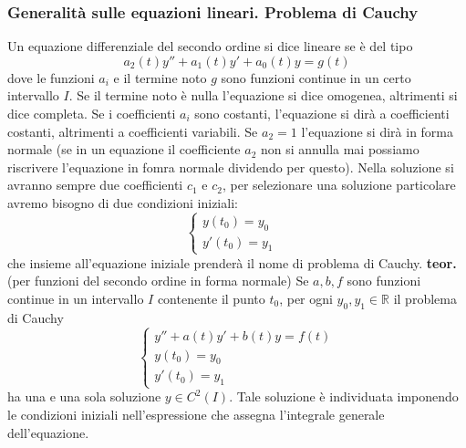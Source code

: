 \subsubsection{Generalità sulle equazioni lineari. Problema di Cauchy}
Un equazione differenziale del secondo ordine si dice lineare se è del tipo
\[
    a_2(t) y'' + a_1(t) y' +a_0(t) y = g(t)
\]
dove le funzioni $a_i$ e il termine noto $g$ sono funzioni continue in un certo intervallo $I$.\newline
Se il termine noto è nulla l'equazione si dice omogenea, altrimenti si dice completa.\newline
Se i coefficienti $a_i$ sono costanti, l'equazione si dirà a coefficienti costanti, altrimenti a coefficienti variabili.\newline
Se $a_2 = 1$ l'equazione si dirà in forma normale (se in un equazione il coefficiente $a_2$ non si annulla mai possiamo riscrivere l'equazione in fomra normale dividendo per questo).\newline
\newline
Nella soluzione si avranno sempre due coefficienti $c_1$ e $c_2$, per selezionare una soluzione particolare avremo bisogno di due condizioni iniziali:
\[
    \begin{cases}
        y(t_0) = y_0&\\
        y'(t_0) = y_1
    \end{cases}
\]
che insieme all'equazione iniziale prenderà il nome di problema di Cauchy.\newline
\newline
\textbf{teor.} (per funzioni del secondo ordine in forma normale)\newline
Se $a, b, f$ sono funzioni continue in un intervallo $I$ contenente il punto $t_0$, per ogni $y_0, y_1 \in \mathbb{R}$ il problema di Cauchy
\[
    \begin{cases}
        y'' + a(t) y' + b(t) y = f(t)\\
        y(t_0) = y_0\\
        y'(t_0) = y_1
    \end{cases}
\]
ha una e una sola soluzione $y \in C^2(I)$.\newline
Tale soluzione è individuata imponendo le condizioni iniziali nell'espressione che assegna l'integrale generale dell'equazione.
